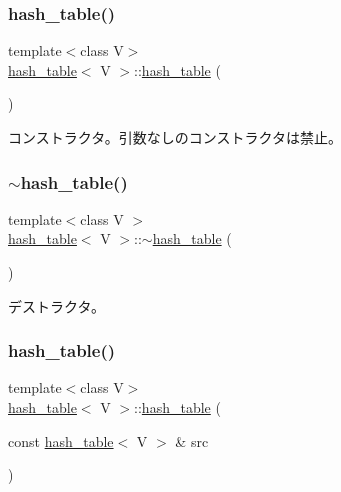 \subsubsection{\texorpdfstring{hash\+\_\+table()}{hash\_table()}\hspace{0.1cm}{\footnotesize\ttfamily [2/4]}}
{\footnotesize\ttfamily template$<$class V$>$ \\
\hyperlink{classhash__table}{hash\+\_\+table}$<$ V $>$\+::\hyperlink{classhash__table}{hash\+\_\+table} (\begin{DoxyParamCaption}{ }\end{DoxyParamCaption})\hspace{0.3cm}{\ttfamily [delete]}}

コンストラクタ。引数なしのコンストラクタは禁止。 \hypertarget{classhash__table_ada4ba869398b6330ed4d8366cbad3659}{}\label{classhash__table_ada4ba869398b6330ed4d8366cbad3659} 
\subsubsection{\texorpdfstring{$\sim$hash\+\_\+table()}{~hash\_table()}}
{\footnotesize\ttfamily template$<$class V $>$ \\
\hyperlink{classhash__table}{hash\+\_\+table}$<$ V $>$\+::$\sim$\hyperlink{classhash__table}{hash\+\_\+table} (\begin{DoxyParamCaption}{ }\end{DoxyParamCaption})\hspace{0.3cm}{\ttfamily [virtual]}}

デストラクタ。 \hypertarget{classhash__table_a30a71ef67b26dc4ec16a56c003105c9a}{}\label{classhash__table_a30a71ef67b26dc4ec16a56c003105c9a} 
\subsubsection{\texorpdfstring{hash\+\_\+table()}{hash\_table()}\hspace{0.1cm}{\footnotesize\ttfamily [3/4]}}
{\footnotesize\ttfamily template$<$class V$>$ \\
\hyperlink{classhash__table}{hash\+\_\+table}$<$ V $>$\+::\hyperlink{classhash__table}{hash\+\_\+table} (\begin{DoxyParamCaption}\item[{const \hyperlink{classhash__table}{hash\+\_\+table}$<$ V $>$ \&}]{src }\end{DoxyParamCaption})\hspace{0.3cm}{\ttfamily [delete]}}

